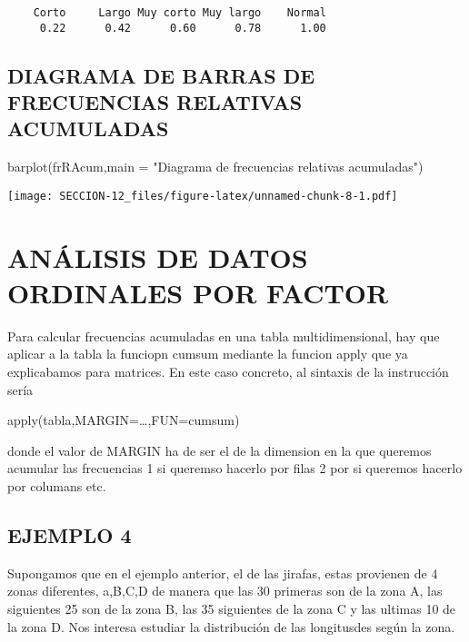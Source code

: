 \documentclass[
]{article}
\newenvironment{Shaded}{\begin{snugshade}}{\end{snugshade}}
\newcommand{\AttributeTok}[1]{\textcolor[rgb]{0.77,0.63,0.00}{#1}}
\newcommand{\FunctionTok}[1]{\textcolor[rgb]{0.00,0.00,0.00}{#1}}
\newcommand{\NormalTok}[1]{#1}
\newcommand{\StringTok}[1]{\textcolor[rgb]{0.31,0.60,0.02}{#1}}
\begin{document}
\begin{verbatim}
    Corto     Largo Muy corto Muy largo    Normal 
     0.22      0.42      0.60      0.78      1.00 
\end{verbatim}

\hypertarget{diagrama-de-barras-de-frecuencias-relativas-acumuladas}{%
\subsection{DIAGRAMA DE BARRAS DE FRECUENCIAS RELATIVAS
ACUMULADAS}\label{diagrama-de-barras-de-frecuencias-relativas-acumuladas}}

\begin{Shaded}
\begin{Highlighting}[]
\FunctionTok{barplot}\NormalTok{(frRAcum,}\AttributeTok{main =} \StringTok{"Diagrama de frecuencias relativas acumuladas"}\NormalTok{)}
\end{Highlighting}
\end{Shaded}

\texttt{[image: SECCION-12\_files/figure-latex/unnamed-chunk-8-1.pdf]}

\hypertarget{anuxe1lisis-de-datos-ordinales-por-factor}{%
\section{ANÁLISIS DE DATOS ORDINALES POR
FACTOR}\label{anuxe1lisis-de-datos-ordinales-por-factor}}

Para calcular frecuencias acumuladas en una tabla multidimensional, hay
que aplicar a la tabla la funciopn cumsum mediante la funcion apply que
ya explicabamos para matrices. En este caso concreto, al sintaxis de la
instrucción sería

apply(tabla,MARGIN=\ldots,FUN=cumsum)

donde el valor de MARGIN ha de ser el de la dimension en la que queremos
acumular las frecuencias 1 si queremso hacerlo por filas 2 por si
queremos hacerlo por columans etc.

\hypertarget{ejemplo-4}{%
\subsection{EJEMPLO 4}\label{ejemplo-4}}

Supongamos que en el ejemplo anterior, el de las jirafas, estas
provienen de 4 zonas diferentes, a,B,C,D de manera que las 30 primeras
son de la zona A, las siguientes 25 son de la zona B, las 35 siguientes
de la zona C y las ultimas 10 de la zona D. Nos interesa estudiar la
distribución de las longitusdes según la zona.
\end{document}
